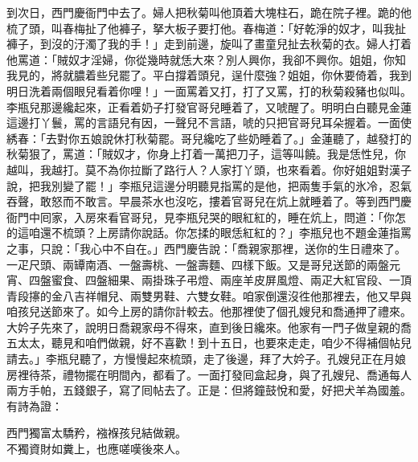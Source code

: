 到次日，西門慶衙門中去了。婦人把秋菊叫他頂着大塊柱石，跪在院子裡。跪的他梳了頭，叫春梅扯了他褲子，拏大板子要打他。春梅道：「好乾淨的奴才，叫我扯褲子，到沒的汙濁了我的手！」走到前邊，旋叫了畫童兒扯去秋菊的衣。婦人打着他罵道：「賊奴才淫婦，你從幾時就恁大來？別人興你，我卻不興你。姐姐，你知我見的，將就膿着些兒罷了。平白撐着頭兒，逞什麼強？姐姐，你休要倚着，我到明日洗着兩個眼兒看着你哩！」{}一面罵着又打，打了又罵，打的秋菊殺豬也似叫。李瓶兒那邊纔起來，正看着奶子打發官哥兒睡着了，又唬醒了。明明白白聽見金蓮這邊打丫鬟，罵的言語兒有因，一聲兒不言語，唬的只把官哥兒耳朵握着。一面使綉春：「去對你五娘說休打秋菊罷。哥兒纔吃了些奶睡着了。」金蓮聽了，越發打的秋菊狠了，罵道：「賊奴才，你身上打着一萬把刀子，這等叫饒。我是恁性兒，你越叫，我越打。{}莫不為你拉斷了路行人？人家打丫頭，也來看着。你好姐姐對漢子說，把我別變了罷！」李瓶兒這邊分明聽見指罵的是他，把兩隻手氣的氷冷，忍氣吞聲，敢怒而不敢言。早晨茶水也沒吃，摟着官哥兒在炕上就睡着了。等到西門慶衙門中囘家，入房來看官哥兒，見李瓶兒哭的眼紅紅的，睡在炕上，問道：「你怎的這咱還不梳頭？上房請你說話。你怎揉的眼恁紅紅的？」李瓶兒也不題金蓮指罵之事，只說：「我心中不自在。」西門慶告說：「喬親家那裡，送你的生日禮來了。一疋尺頭、兩罈南酒、一盤壽桃、一盤壽麵、四樣下飯。又是哥兒送節的兩盤元宵、四盤蜜食、四盤細果、兩掛珠子弔燈、兩座羊皮屏風燈、兩疋大紅官段、一頂青段㩟的金八吉祥帽兒、兩雙男鞋、六雙女鞋。咱家倒還沒徃他那裡去，他又早與咱孩兒送節來了。如今上房的請你計較去。他那裡使了個孔嫂兒和喬通押了禮來。大妗子先來了，說明日喬親家母不得來，直到後日纔來。他家有一門子做皇親的喬五太太，聽見和咱們做親，好不喜歡！到十五日，也要來走走，咱少不得補個帖兒請去。」李瓶兒聽了，方慢慢起來梳頭，走了後邊，拜了大妗子。孔嫂兒正在月娘房裡待茶，禮物擺在明間內，都看了。一面打發囘盒起身，與了孔嫂兒、喬通每人兩方手帕，五錢銀子，寫了囘帖去了。正是：但將鐘鼓悅和愛，好把犬羊為國羞。有詩為證：

\begin{myquote}
西門獨富太驕矜，襁褓孩兒結做親。\\不獨資財如糞上，也應嗟嘆後來人。
\end{myquote}
